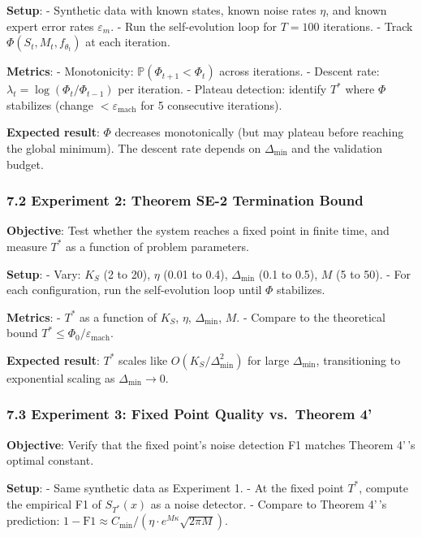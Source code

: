 \documentclass[
  12pt,
]{article}
\begin{document}
\textbf{Setup}: - Synthetic data with known states, known noise rates
\(\eta\), and known expert error rates \(\varepsilon_m\). - Run the
self-evolution loop for \(T = 100\) iterations. - Track
\(\Phi(S_t, M_t, f_{\theta_t})\) at each iteration.

\textbf{Metrics}: - Monotonicity: \(\mathbb{P}(\Phi_{t+1} < \Phi_t)\)
across iterations. - Descent rate:
\(\lambda_t = \log(\Phi_t / \Phi_{t-1})\) per iteration. - Plateau
detection: identify \(T^*\) where \(\Phi\) stabilizes (change
\(< \varepsilon_{\text{mach}}\) for 5 consecutive iterations).

\textbf{Expected result}: \(\Phi\) decreases monotonically (but may
plateau before reaching the global minimum). The descent rate depends on
\(\Delta_{\min}\) and the validation budget.

\subsubsection{7.2 Experiment 2: Theorem SE-2 Termination
Bound}\label{experiment-2-theorem-se-2-termination-bound}

\textbf{Objective}: Test whether the system reaches a fixed point in
finite time, and measure \(T^*\) as a function of problem parameters.

\textbf{Setup}: - Vary: \(K_S\) (2 to 20), \(\eta\) (0.01 to 0.4),
\(\Delta_{\min}\) (0.1 to 0.5), \(M\) (5 to 50). - For each
configuration, run the self-evolution loop until \(\Phi\) stabilizes.

\textbf{Metrics}: - \(T^*\) as a function of \(K_S\), \(\eta\),
\(\Delta_{\min}\), \(M\). - Compare to the theoretical bound
\(T^* \leq \Phi_0/\varepsilon_{\text{mach}}\).

\textbf{Expected result}: \(T^*\) scales like \(O(K_S/\Delta_{\min}^2)\)
for large \(\Delta_{\min}\), transitioning to exponential scaling as
\(\Delta_{\min} \to 0\).

\subsubsection{7.3 Experiment 3: Fixed Point Quality vs.~Theorem
4'}\label{experiment-3-fixed-point-quality-vs.-theorem-4}

\textbf{Objective}: Verify that the fixed point's noise detection F1
matches Theorem 4'\,'s optimal constant.

\textbf{Setup}: - Same synthetic data as Experiment 1. - At the fixed
point \(T^*\), compute the empirical F1 of \(S_{T^*}(x)\) as a noise
detector. - Compare to Theorem 4'\,'s prediction:
\(1 - \text{F1} \approx C_{\min}/(\eta \cdot e^{M\kappa}\sqrt{2\pi M})\).
\end{document}
